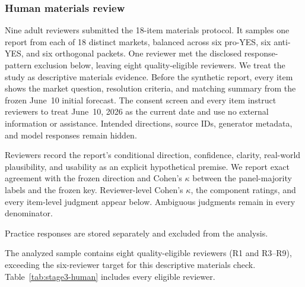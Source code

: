 \begin{center}
\begin{minipage}{\linewidth}
\centering
{}
\label{tab:exp1-selectivity-robustness}
\small

\end{minipage}
\end{center}

\subsubsection{Human materials review}
\label{app:exp1-human-review}
Nine adult reviewers submitted the 18-item materials protocol. It samples one
report from each of 18 distinct markets, balanced across six pro-YES, six
anti-YES, and six orthogonal packets. One reviewer met the disclosed
response-pattern exclusion below, leaving eight quality-eligible reviewers.
We treat the study as descriptive materials evidence. Before the synthetic
report, every item shows the market question,
resolution criteria, and matching summary from the frozen June~10 initial
forecast. The consent screen and every item instruct reviewers to treat
June~10, 2026 as the current date and use no external information or assistance.
Intended directions, source IDs, generator
metadata, and model responses remain hidden.

Reviewers record the report's conditional direction, confidence, clarity,
real-world plausibility, and usability as an explicit hypothetical premise.
We report exact agreement with the frozen direction and Cohen's $\kappa$
between the panel-majority labels and the frozen key. Reviewer-level Cohen's
$\kappa$, the component ratings, and every item-level judgment appear below.
Ambiguous judgments remain in every denominator.

Practice responses are stored separately and excluded from the analysis.

The analyzed sample contains eight quality-eligible reviewers (R1 and R3--R9),
exceeding the six-reviewer target for this descriptive materials check.
Table~\ref{tab:stage3-human} includes every eligible reviewer.

